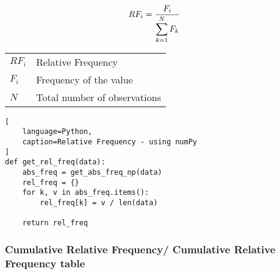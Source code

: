 \begin{table}[H]
    \begin{minipage}{0.3\linewidth}
        \[
            \begin{aligned}
                RF_i 
                    &= \dfrac{F_{i}}{\displaystyle\sum_{k=1}^{N} F_{k}}
            \end{aligned}
        \]
    \end{minipage}
    \begin{minipage}{0.65\linewidth}
        \begin{table}[H]
            \begin{tabular}{l l}
                $RF_i$ & Relative Frequency \\
                $F_i$ & Frequency of the value \\ 
                $N$ & Total number of observations \\ 
            \end{tabular}
        \end{table}
    \end{minipage}
\end{table}


\begin{lstlisting}[
    language=Python, 
    caption=Relative Frequency - using numPy
]
def get_rel_freq(data):
    abs_freq = get_abs_freq_np(data)
    rel_freq = {}
    for k, v in abs_freq.items():
        rel_freq[k] = v / len(data)
    
    return rel_freq
\end{lstlisting}


\subsubsection{Cumulative Relative Frequency/ Cumulative Relative Frequency table \cite{statistics/book/Statistics-for-Data-Scientists/Maurits-Kaptein}}\label{Data/Describing Data/Frequency or Frequency table/Cumulative Relative}

